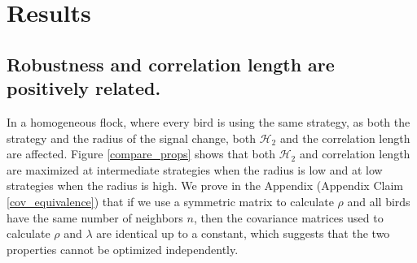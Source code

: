 \documentclass{article}
\begin{document}
%
%
%
%  


\section{Results }

\subsection{Robustness and correlation length are positively related. }
In a homogeneous flock, where every bird is using the same strategy, as both the strategy and the radius of the signal change, both $\mathscr{H}_2$ and the correlation length are affected.  Figure \ref{compare_props} shows that both $\mathscr{H}_2$ and correlation length are maximized at intermediate strategies when the radius is low and at low strategies when the radius is high. We prove in the Appendix (Appendix Claim \ref{cov_equivalence}) that if we use a symmetric matrix to calculate $\rho$ and all birds have the same number of neighbors $n$, then the covariance matrices used to calculate $\rho$ and $\lambda$ are identical up to a constant, which suggests that the two properties cannot be optimized independently.
\end{document}
